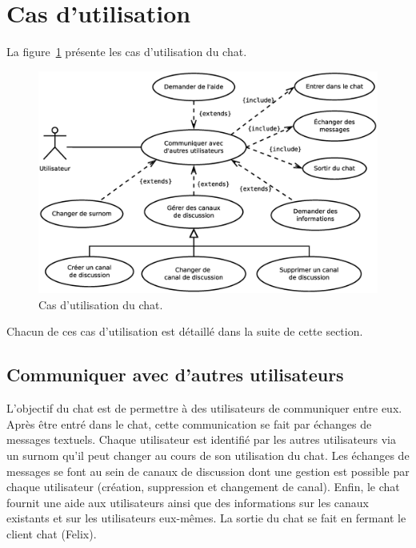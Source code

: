 %

\section{Cas d'utilisation}
\label{sec:cu}

La figure~\ref{sec:cu:figcu} présente les cas d'utilisation du chat.

\medskip
\begin{figure}[h!]
\includegraphics[width=\linewidth]{../img/Chat_CU.eps}
\caption{Cas d'utilisation du chat.}
\label{sec:cu:figcu}
\end{figure}

\medskip
Chacun de ces cas d'utilisation est détaillé dans la suite de cette section.

\subsection{Communiquer avec d'autres utilisateurs}
\label{sec:cu:communiquer}

L'objectif du chat est de permettre à des utilisateurs de communiquer entre eux. Après être entré dans le chat, cette communication se fait par échanges de messages textuels. Chaque utilisateur est identifié par les autres utilisateurs via un surnom qu'il peut changer au cours de son utilisation du chat. Les échanges de messages se font au sein de canaux de discussion dont une gestion est possible par chaque utilisateur (création, suppression et changement de canal). Enfin, le chat fournit une aide aux utilisateurs ainsi que des informations sur les canaux existants et sur les utilisateurs eux-mêmes. La sortie du chat se fait en fermant le client chat (Felix).

